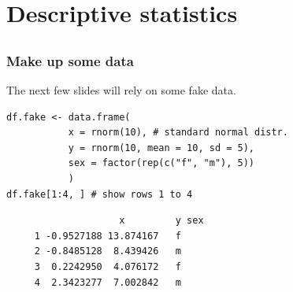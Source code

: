 \documentclass[bigger]{beamer}
\begin{document}
\section{Descriptive statistics}
\label{sec-5}
\subsection{}
\begin{frame}[fragile]
\frametitle{Make up some data}
\label{sec-5-1-1}

    The next few slides will rely on some fake data. 

\lstset{language=R}
\begin{lstlisting}
df.fake <- data.frame(
           x = rnorm(10), # standard normal distr.
           y = rnorm(10, mean = 10, sd = 5),
           sex = factor(rep(c("f", "m"), 5))
           )
df.fake[1:4, ] # show rows 1 to 4
\end{lstlisting}

\begin{verbatim}
                    x         y sex
     1 -0.9527188 13.874167   f
     2 -0.8485128  8.439426   m
     3  0.2242950  4.076172   f
     4  2.3423277  7.002842   m
\end{verbatim}
\end{frame}
\end{document}
